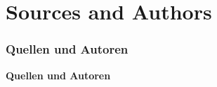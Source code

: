 %

\section{Sources and Authors}
\begin{frame}[fragile]
	\frametitle{Quellen und Autoren}

	\begin{center}\huge{\color{typo3darkgrey}\textbf{Quellen und Autoren}}\end{center}

\end{frame}


